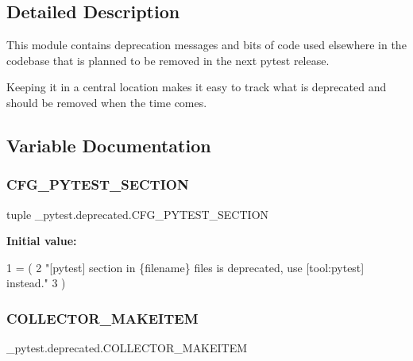 \subsection{Detailed Description}
\begin{DoxyVerb}This module contains deprecation messages and bits of code used elsewhere in the codebase
that is planned to be removed in the next pytest release.

Keeping it in a central location makes it easy to track what is deprecated and should
be removed when the time comes.
\end{DoxyVerb}
 

\subsection{Variable Documentation}
\mbox{\label{namespace__pytest_1_1deprecated_a4f74b21f03f654b2e7238ceaf0077034}} 
\subsubsection{\texorpdfstring{C\+F\+G\+\_\+\+P\+Y\+T\+E\+S\+T\+\_\+\+S\+E\+C\+T\+I\+ON}{CFG\_PYTEST\_SECTION}}
{\footnotesize\ttfamily tuple \+\_\+pytest.\+deprecated.\+C\+F\+G\+\_\+\+P\+Y\+T\+E\+S\+T\+\_\+\+S\+E\+C\+T\+I\+ON}

{\bfseries Initial value\+:}
\begin{DoxyCode}
1 =  (
2     \textcolor{stringliteral}{"[pytest] section in \{filename\} files is deprecated, use [tool:pytest] instead."}
3 )
\end{DoxyCode}
\mbox{\label{namespace__pytest_1_1deprecated_afe1136bbbb6f3fe732391652bae92661}} 
\subsubsection{\texorpdfstring{C\+O\+L\+L\+E\+C\+T\+O\+R\+\_\+\+M\+A\+K\+E\+I\+T\+EM}{COLLECTOR\_MAKEITEM}}
{\footnotesize\ttfamily \+\_\+pytest.\+deprecated.\+C\+O\+L\+L\+E\+C\+T\+O\+R\+\_\+\+M\+A\+K\+E\+I\+T\+EM}

